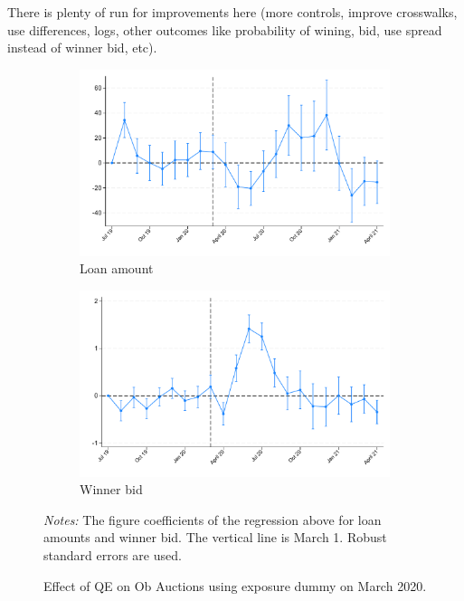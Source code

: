 \documentclass[11pt,a4paper]{article}
\begin{document}
There is plenty of run for improvements here (more controls, improve crosswalks, use differences, logs, other outcomes like probability of wining, bid, use spread instead of winner bid, etc).
\begin{figure}[h]
    \centering
    \begin{subfigure}[b]{0.49\textwidth}
        \includegraphics[width=0.998\textwidth]{../results/figures/did_loan_amount_exposure_march_dummy.pdf}
        \caption{ Loan amount }\label{fig:loan_amount}
       \end{subfigure}
       \begin{subfigure}[b]{0.49\textwidth}
        \includegraphics[width=0.998\textwidth]{../results/figures/did_winner_bid_exposure_march_dummy.pdf}
        \caption{ Winner bid }\label{fig:winner_bid}
       \end{subfigure}
       \caption{Effect of QE on Ob Auctions using exposure dummy on March 2020.}\label{fig:did_exp_amount}
     \begin{minipage}{\textwidth}
        \footnotesize{\textit{Notes:}  The figure coefficients of the regression above for loan amounts and winner bid. The vertical line is March 1.  Robust standard errors are used. }
        \end{minipage}
  \end{figure}
  
\end{document}
